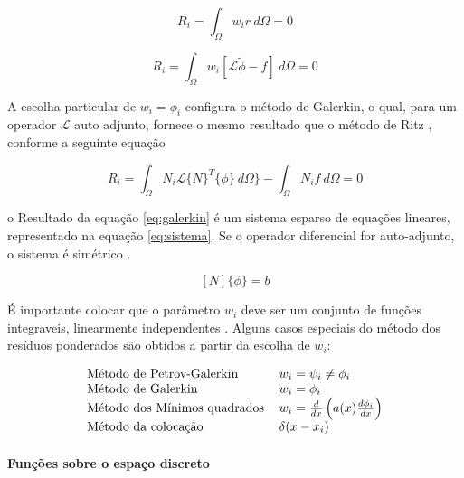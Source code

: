   \begin{equation}
  	\label{eq:res1}
 	R_i = \int_{\Omega}{w_i r \ d\Omega} = 0
  \end{equation}
  
  \begin{equation}
  	\label{eq:res2}
 	R_i = \int_{\Omega}{w_i [\mathcal{L} \tilde{\phi} - f] \ d\Omega} = 0
  \end{equation}  


A escolha particular de $w_i = \phi_i$ configura o método de Galerkin, o qual, para um operador $\mathcal{L}$ auto adjunto, fornece o mesmo resultado que o método de Ritz  \citep[p. 22]{jin}, conforme a seguinte equação

  \begin{equation}
  	\label{eq:galerkin}
 	R_i = 
 	\int_{\Omega}{N_i \mathcal{L} \{N\}^T \{\phi\} \ d\Omega\}} - \int_{\Omega}{N_i f \ d \Omega} = 0
  \end{equation}  
  
  
  o Resultado da equação \ref{eq:galerkin} é um sistema esparso de equações lineares, representado na equação \ref{eq:sistema}. Se o operador diferencial for auto-adjunto, o sistema é simétrico \citep[p. 36]{volakis}.
  
    \begin{equation}
    	\label{eq:sistema}
		[N]\{\phi\} = {b}
    \end{equation}  

É importante colocar que o parâmetro $w_i$ deve ser um conjunto de funções integraveis, linearmente independentes
\citep[p. 60]{reddy}. Alguns casos especiais do método dos resíduos ponderados são obtidos a partir da escolha de $w_i$:

\begin{equation}
\label{eq:metPond}
	\begin{tabular}{ l l }
	Método de Petrov-Galerkin & $ w_i = \psi_i \neq \phi_i $ \\ 
	Método de Galerkin & $ w_i = \phi_i $\\  
	Método dos Mínimos quadrados & $ w_i = \frac{d}{dx} \left(a(x)\frac{d \phi_i}{dx}\right) $ \\ 
	Método da colocação & $ \delta(x - x_i)  $ 
	\end{tabular}
\end{equation}



\paragraph{Funções sobre o espaço discreto \\}

